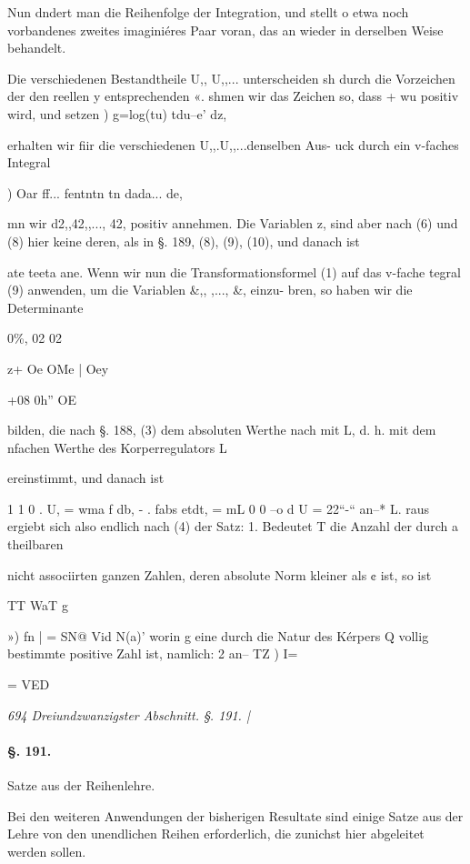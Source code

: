 \documentclass[12pt,a4paper]{article}
\theoremstyle{plain}
\theoremstyle{definition}
\begin{document}
Nun dndert man die Reihenfolge der Integration, und stellt o etwa noch vorbandenes zweites imaginiéres Paar voran, das an wieder in derselben Weise behandelt.

Die verschiedenen Bestandtheile U,, U,,... unterscheiden sh durch die Vorzeichen der den reellen y entsprechenden «. shmen wir das Zeichen so, dass + wu positiv wird, und setzen ) g=log(tu) tdu--e' dz,

erhalten wir fiir die verschiedenen U,,.U,,...denselben Aus- uck durch ein v-faches Integral

) Oar ff... fentntn tn dada... de,

mn wir d2,,42,,..., 42, positiv annehmen. Die Variablen z, sind aber nach (6) und (8) hier keine deren, als in §. 189, (8), (9), (10), und danach ist

ate teeta ane. Wenn wir nun die Transformationsformel (1) auf das v-fache tegral (9) anwenden, um die Variablen \&,, ,..., \&, einzu- bren, so haben wir die Determinante

0\%, 02 02

z+ Oe OMe | Oey

+08 0h'' OE

bilden, die nach §. 188, (3) dem absoluten Werthe nach mit L, d. h. mit dem nfachen Werthe des Korperregulators L

ereinstimmt, und danach ist

1 1 0 . U, = wma f db, - . fabs etdt, = mL 0 0 --o d U = 22``-`` an--* L. raus ergiebt sich also endlich nach (4) der Satz: 1. Bedeutet T die Anzahl der durch a theilbaren

nicht associirten ganzen Zahlen, deren absolute Norm kleiner als ¢ ist, so ist

TT WaT g

») fn | = SN@ Vid N(a)' worin g eine durch die Natur des Kérpers Q vollig bestimmte positive Zahl ist, namlich: 2 an-- TZ ) I=

= VED

\vspace{0.5\baselineskip}\noindent\textit{694 Dreiundzwanzigster Abschnitt. §. 191. |}\par

\paragraph{§. 191.}

Satze aus der Reihenlehre.

Bei den weiteren Anwendungen der bisherigen Resultate sind einige Satze aus der Lehre von den unendlichen Reihen erforderlich, die zunichst hier abgeleitet werden sollen.
\end{document}
